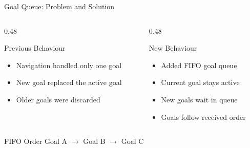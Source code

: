 \documentclass[aspectratio=169, 11pt]{beamer}
\begin{document}

\begin{frame}[t]{Goal Queue: Problem and Solution}
\small

\begin{columns}[T,onlytextwidth]
\begin{column}{0.48\textwidth}
\begin{block}{Previous Behaviour}
\begin{itemize}
    \item Navigation handled only one goal
    \item New goal replaced the active goal
    \item Older goals were discarded
\end{itemize}
\end{block}
\end{column}

\begin{column}{0.48\textwidth}
\begin{block}{New Behaviour}
\begin{itemize}
    \item Added FIFO goal queue
    \item Current goal stays active
    \item New goals wait in queue
    \item Goals follow received order
\end{itemize}
\end{block}
\end{column}
\end{columns}

\vspace{0.25cm}

\begin{block}{FIFO Order}
\centering
\Large Goal A $\rightarrow$ Goal B $\rightarrow$ Goal C
\end{block}

\end{frame}
\end{document}
